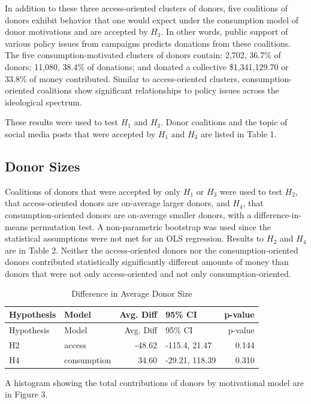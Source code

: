 \documentclass[12pt,]{article}
\begin{document}
In addition to these three access-oriented clusters of donors, five
coalitions of donors exhibit behavior that one would expect under the
consumption model of donor motivations and are accepted by \(H_{3}\). In
other words, public support of various policy issues from campaigns
predicts donations from these coalitions. The five consumption-motivated
clusters of donors contain: 2,702, 36.7\% of donors; 11,080, 38.4\% of
donations; and donated a collective \$1,341,129.70 or 33.8\% of money
contributed. Similar to access-oriented clusters, consumption-oriented
coalitions show significant relationships to policy issues across the
ideological spectrum.

These results were used to test \(H_{1}\) and \(H_{3}\). Donor
coalitions and the topic of social media posts that were accepted by
\(H_{1}\) and \(H_{3}\) are listed in Table 1.

\hypertarget{donor-sizes}{%
\subsection{Donor Sizes}\label{donor-sizes}}

Coalitions of donors that were accepted by only \(H_{1}\) or \(H_{3}\)
were used to test \(H_{2}\), that access-oriented donors are on-average
larger donors, and \(H_{4}\), that consumption-oriented donors are
on-average smaller donors, with a difference-in-means permutation test.
A non-parametric bootstrap was used since the statistical assumptions
were not met for an OLS regression. Results to \(H_{2}\) and \(H_{4}\)
are in Table 2. Neither the access-oriented donors nor the
consumption-oriented donors contributed statistically significantly
different amounts of money than donors that were not only
access-oriented and not only consumption-oriented.

\begin{longtable}[]{@{}llrlr@{}}
\caption{Difference in Average Donor Size}\tabularnewline
\toprule
Hypothesis & Model & Avg. Diff & 95\% CI & p-value\tabularnewline
\midrule
\endfirsthead
\toprule
Hypothesis & Model & Avg. Diff & 95\% CI & p-value\tabularnewline
\midrule
\endhead
H2 & access & -48.62 & -115.4, 21.47 & 0.144\tabularnewline
H4 & consumption & 34.60 & -29.21, 118.39 & 0.310\tabularnewline
\bottomrule
\end{longtable}

A histogram showing the total contributions of donors by motivational
model are in Figure 3.
\end{document}
